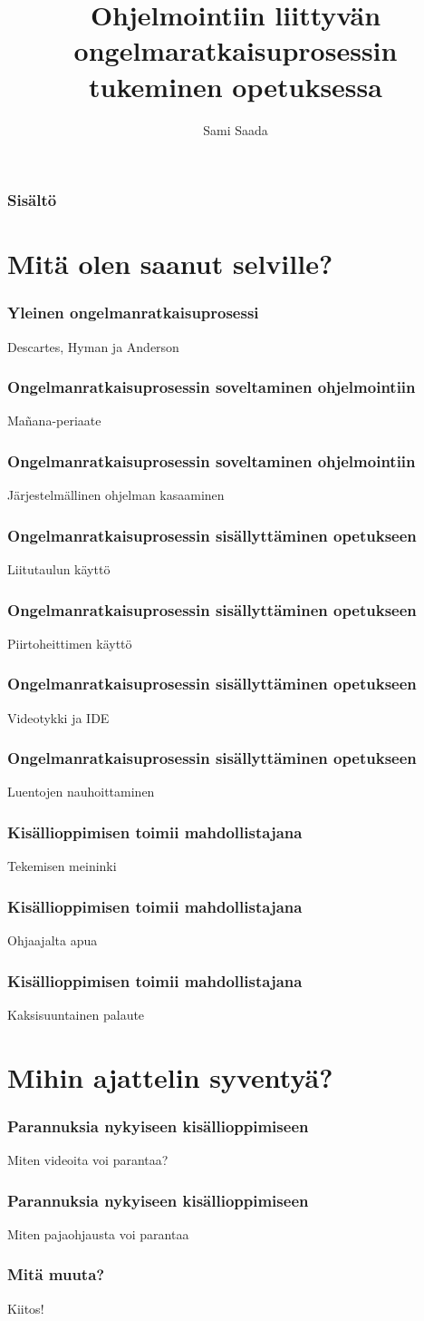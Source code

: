 \documentclass[finnish]{beamer}
\author{Sami Saada}
\title{Ohjelmointiin liittyvän ongelmaratkaisuprosessin tukeminen opetuksessa}
\institute{Tietojenkäsittelytieteen laitos}
\begin{document}
\HyTitle

\frame
{
  \frametitle{Sisältö}
  \tableofcontents
}

\section{Mitä olen saanut selville?}

\frame
{
  \frametitle{Yleinen ongelmanratkaisuprosessi}

  Descartes, Hyman ja Anderson
}

\frame
{
  \frametitle{Ongelmanratkaisuprosessin soveltaminen ohjelmointiin}

  Mañana-periaate
}

\frame
{
  \frametitle{Ongelmanratkaisuprosessin soveltaminen ohjelmointiin}

  Järjestelmällinen ohjelman kasaaminen
}

\frame
{
  \frametitle{Ongelmanratkaisuprosessin sisällyttäminen opetukseen}

  Liitutaulun käyttö
}

\frame
{
  \frametitle{Ongelmanratkaisuprosessin sisällyttäminen opetukseen}

  Piirtoheittimen käyttö
}

\frame
{
  \frametitle{Ongelmanratkaisuprosessin sisällyttäminen opetukseen}

  Videotykki ja IDE
}

\frame
{
  \frametitle{Ongelmanratkaisuprosessin sisällyttäminen opetukseen}

  Luentojen nauhoittaminen
}

\frame
{
  \frametitle{Kisällioppimisen toimii mahdollistajana}

  Tekemisen meininki
}

\frame
{
  \frametitle{Kisällioppimisen toimii mahdollistajana}

  Ohjaajalta apua
}

\frame
{
  \frametitle{Kisällioppimisen toimii mahdollistajana}

  Kaksisuuntainen palaute
}

\section{Mihin ajattelin syventyä?}

\frame
{
  \frametitle{Parannuksia nykyiseen kisällioppimiseen}

  Miten videoita voi parantaa?
}

\frame
{
  \frametitle{Parannuksia nykyiseen kisällioppimiseen}

  Miten pajaohjausta voi parantaa
}

\frame
{
  \frametitle{Mitä muuta?}

  Kiitos!
}
\end{document}
